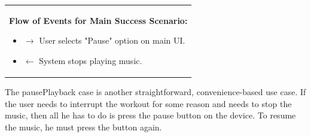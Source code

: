 \documentclass[letterpaper,english, 12pt]{scrreprt}
\begin{document}
\begin{center}
\begin{tabular}{|C{15cm}|}
\begin{flushleft}
                                \textbf{Flow of Events for Main Success Scenario: }
                        \end{flushleft}
                                \begin{itemize}
                                        \item $\rightarrow$ User selects "Pause" option on main UI.
                                        \item $\leftarrow$ System stops playing music.
                                \end{itemize}
                \hline
        \end{tabular}
\end{center}

The pausePlayback case is another straightforward, convenience-based use case. If the user needs to interrupt the workout for some reason and needs to stop the music, then all he has to do is press the pause button on the device. To resume the music, he must press the button again.
\end{document}
